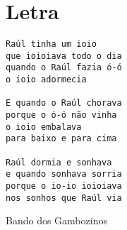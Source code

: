 \documentclass[12pt]{article}
\begin{document}
\maketitle
\section*{Letra}
\begin{center}
\begin{verbatim}
Raúl tinha um ioio
que ioioiava todo o dia
quando o Raúl fazia ó-ó
o ioio adormecia

E quando o Raúl chorava
porque o ó-ó não vinha
o ioio embalava
para baixo e para cima

Raúl dormia e sonhava
e quando sonhava sorria
porque o io-io ioioiava
nos sonhos que Raúl via
\end{verbatim}
\vspace{5mm}
\hfill  Bando dos Gambozinos
\end{center}
\end{document}
